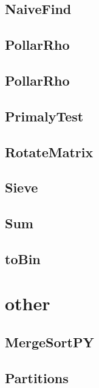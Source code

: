 \subsection{ NaiveFind}
\raggedbottom
\hrulefill
\subsection{ PollarRho}
\raggedbottom
\hrulefill
\subsection{ PollarRho}
\raggedbottom
\hrulefill
\subsection{ PrimalyTest}
\raggedbottom
\hrulefill
\subsection{ RotateMatrix}
\raggedbottom
\hrulefill
\subsection{ Sieve}
\raggedbottom
\hrulefill
\subsection{ Sum}
\raggedbottom
\hrulefill
\subsection{ toBin}
\raggedbottom
\hrulefill

\section{other}
\subsection{ MergeSortPY}
\raggedbottom
\hrulefill
\subsection{ Partitions}
\raggedbottom
\hrulefill
